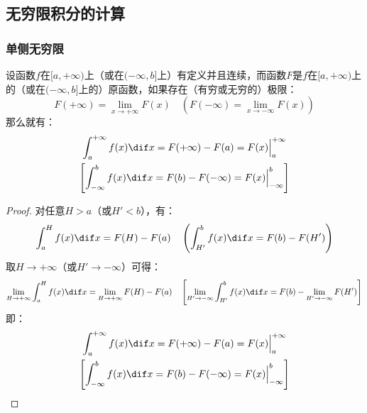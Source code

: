 \subsection{无穷限积分的计算}
\subsubsection{单侧无穷限}
\begin{theorem}
	设函数$f$在$[a,+\infty)$上（或在$(-\infty,b]$上）有定义并且连续，而函数$F$是$f$在$[a,+\infty)$上的（或在$(-\infty,b]$上的）原函数，如果存在（有穷或无穷的）极限：
	\begin{equation*}
		F(+\infty)=\lim_{x\to+\infty}F(x)\quad
		\left(F(-\infty)=\lim_{x\to-\infty}F(x)\right)
	\end{equation*}
	那么就有：
	\begin{gather*}
		\int_{a}^{+\infty}f(x)\dif x=F(+\infty)-F(a)=F(x)\Big|_a^{+\infty} \\
		\left[\int_{-\infty}^{b}f(x)\dif x=F(b)-F(-\infty)=F(x)\Big|_{-\infty}^b\right]
	\end{gather*}
\end{theorem}
\begin{proof}
	对任意$H>a$（或$H'<b$），有：
	\begin{equation*}
		\int_{a}^{H}f(x)\dif x=F(H)-F(a)\quad
		\left(\int_{H'}^{b}f(x)\dif x=F(b)-F(H')\right)
	\end{equation*}
	取$H\to+\infty$（或$H'\to-\infty$）可得：
	\begin{equation*}
		\lim_{H\to+\infty}\int_{a}^{H}f(x)\dif x=\lim_{H\to+\infty}F(H)-F(a)\quad
		\left[\lim_{H'\to-\infty}\int_{H'}^{b}f(x)\dif x=F(b)-\lim_{H'\to-\infty}F(H')\right]
	\end{equation*}
	即：
	\begin{gather*}
		\int_{a}^{+\infty}f(x)\dif x=F(+\infty)-F(a)=F(x)\Big|_a^{+\infty} \\
		\left[\int_{-\infty}^{b}f(x)\dif x=F(b)-F(-\infty)=F(x)\Big|_{-\infty}^b\right]
	\end{gather*}
\end{proof}
